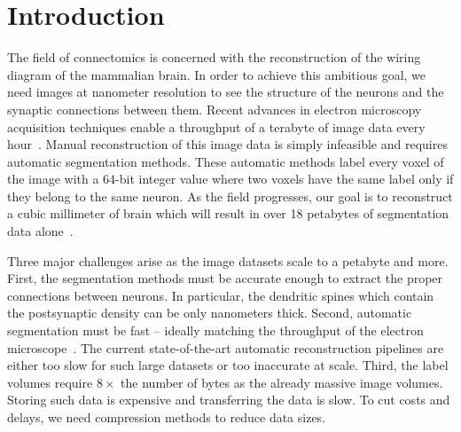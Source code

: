 \section{Introduction}

The field of connectomics is concerned with the reconstruction of the wiring diagram of the mammalian brain.
In order to achieve this ambitious goal, we need images at nanometer resolution to see the structure of the neurons and the synaptic connections between them.
Recent advances in electron microscopy acquisition techniques enable a throughput of a terabyte of image data every hour~\cite{richard2016imaging}.
Manual reconstruction of this image data is simply infeasible and requires automatic segmentation methods.
These automatic methods label every voxel of the image with a 64-bit integer value where two voxels have the same label only if they belong to the same neuron.
As the field progresses, our goal is to reconstruct a cubic millimeter of brain which will result in over 18 petabytes of segmentation data alone~\cite{suissa2016automatic}.

Three major challenges arise as the image datasets scale to a petabyte and more. 
First, the segmentation methods must be accurate enough to extract the proper connections between neurons.
In particular, the dendritic spines  which contain the postsynaptic density can be only  nanometers thick.
Second, automatic segmentation must be fast -- ideally matching the throughput of the electron microscope~\cite{haehn2017scalable}.
The current state-of-the-art automatic reconstruction pipelines are either too slow for such large datasets or too inaccurate at scale.
Third, the label volumes require $8\times$ the number of bytes as the already massive image volumes.
Storing such data is expensive and transferring the data is slow. 
To cut costs and delays, we need compression methods to reduce data sizes.